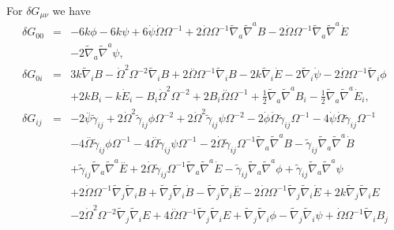 For $\delta G_{\mu\nu}$ we have
%
\begin{eqnarray}
\delta G_{00}&=& -6 k \phi - 6 k \psi + 6 \dot{\psi} \dot{\Omega} \Omega^{-1} + 2 \dot{\Omega} \Omega^{-1} \tilde{\nabla}_{a}\tilde{\nabla}^{a}B - 2 \dot{\Omega} \Omega^{-1} \tilde{\nabla}_{a}\tilde{\nabla}^{a}\dot{E}
\nonumber\\
&& - 2 \tilde{\nabla}_{a}\tilde{\nabla}^{a}\psi, 
\nonumber\\ 
\delta G_{0i}&=& 3 k \tilde{\nabla}_{i}B -  \dot{\Omega}^2 \Omega^{-2} \tilde{\nabla}_{i}B + 2 \overset{..}{\Omega} \Omega^{-1} \tilde{\nabla}_{i}B - 2 k \tilde{\nabla}_{i}\dot{E} - 2 \tilde{\nabla}_{i}\dot{\psi} - 2 \dot{\Omega} \Omega^{-1} \tilde{\nabla}_{i}\phi\nonumber\\
&& +2 k B_{i} -  k \dot{E}_{i} -  B_{i} \dot{\Omega}^2 \Omega^{-2} + 2 B_{i} \overset{..}{\Omega} \Omega^{-1} + \tfrac{1}{2} \tilde{\nabla}_{a}\tilde{\nabla}^{a}B_{i} -  \tfrac{1}{2} \tilde{\nabla}_{a}\tilde{\nabla}^{a}\dot{E}_{i},
\nonumber\\ 
\delta G_{ij}&=& -2 \overset{..}{\psi}\tilde{\gamma}_{ij} + 2 \dot{\Omega}^2\tilde{\gamma}_{ij} \phi \Omega^{-2} + 2 \dot{\Omega}^2\tilde{\gamma}_{ij} \psi \Omega^{-2} - 2 \dot{\phi} \dot{\Omega}\tilde{\gamma}_{ij} \Omega^{-1} - 4 \dot{\psi} \dot{\Omega}\tilde{\gamma}_{ij} \Omega^{-1}\nonumber\\
&& - 4 \overset{..}{\Omega}\tilde{\gamma}_{ij} \phi \Omega^{-1} - 4 \overset{..}{\Omega}\tilde{\gamma}_{ij} \psi \Omega^{-1} - 2 \dot{\Omega}\tilde{\gamma}_{ij} \Omega^{-1} \tilde{\nabla}_{a}\tilde{\nabla}^{a}B - \tilde{\gamma}_{ij} \tilde{\nabla}_{a}\tilde{\nabla}^{a}\dot{B} 
\nonumber\\
&&+\tilde{\gamma}_{ij} \tilde{\nabla}_{a}\tilde{\nabla}^{a}\overset{..}{E} + 2 \dot{\Omega}\tilde{\gamma}_{ij} \Omega^{-1} \tilde{\nabla}_{a}\tilde{\nabla}^{a}\dot{E} 
 - \tilde{\gamma}_{ij} \tilde{\nabla}_{a}\tilde{\nabla}^{a}\phi +\tilde{\gamma}_{ij} \tilde{\nabla}_{a}\tilde{\nabla}^{a}\psi 
 \nonumber\\
 &&+ 2 \dot{\Omega} \Omega^{-1} \tilde{\nabla}_{j}\tilde{\nabla}_{i}B + \tilde{\nabla}_{j}\tilde{\nabla}_{i}\dot{B} -  \tilde{\nabla}_{j}\tilde{\nabla}_{i}\overset{..}{E} - 2 \dot{\Omega} \Omega^{-1} \tilde{\nabla}_{j}\tilde{\nabla}_{i}\dot{E}  + 2 k \tilde{\nabla}_{j}\tilde{\nabla}_{i}E
 \nonumber\\
 && - 2 \dot{\Omega}^2 \Omega^{-2} \tilde{\nabla}_{j}\tilde{\nabla}_{i}E + 4 \overset{..}{\Omega} \Omega^{-1} \tilde{\nabla}_{j}\tilde{\nabla}_{i}E + \tilde{\nabla}_{j}\tilde{\nabla}_{i}\phi -  \tilde{\nabla}_{j}\tilde{\nabla}_{i}\psi +\dot{\Omega} \Omega^{-1} \tilde{\nabla}_{i}B_{j}

\end{eqnarray}
